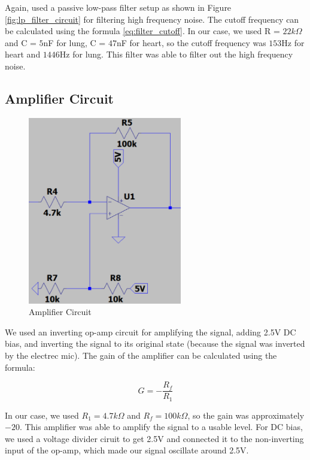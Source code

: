 Again, used a passive low-pass filter setup as shown in Figure \ref{fig:lp_filter_circuit} for filtering high frequency noise. The cutoff frequency can be calculated using the formula \ref{eq:filter_cutoff}. In our case, we used R = $22k\Omega$ and C = $5$nF for lung, C = $47$nF for heart, so the cutoff frequency was $153$Hz for heart and $1446$Hz for lung. This filter was able to filter out the high frequency noise.

\newpage
\thispagestyle{plain}

\subsection{Amplifier Circuit}

\begin{figure}[h]
	\centering
	\includegraphics[width=0.6\textwidth]{assets/amplifier.png}
	\caption{Amplifier Circuit}
	\label{fig:amplifier_circuit}
\end{figure}

We used an inverting op-amp circuit for amplifying the signal, adding 2.5V DC bias, and inverting the signal to its original state (because the signal was inverted by the electrec mic). The gain of the amplifier can be calculated using the formula:

\begin{equation}\label{eq:amplifier_gain}
	G = -\frac{R_f}{R_1}
\end{equation}

In our case, we used $R_1 = 4.7k\Omega$ and $R_f = 100k\Omega$, so the gain was approximately $-20$. This amplifier was able to amplify the signal to a usable level. For DC bias, we used a voltage divider ciruit to get 2.5V and connected it to the non-inverting input of the op-amp, which made our signal oscillate around 2.5V.

